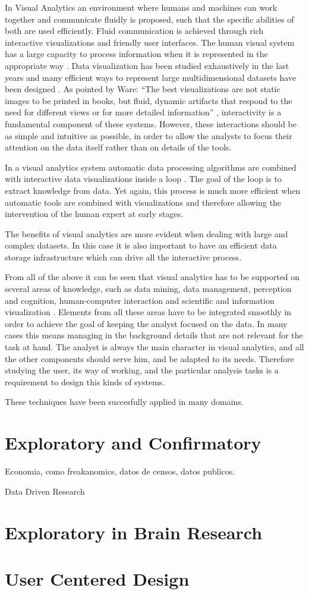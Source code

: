 In Visual Analytics an environment where humans and machines can work
together and communicate fluidly is proposed, such that the specific abilities of both are used
efficiently. Fluid communication is achieved through rich interactive
visualizations and friendly user interfaces.
The human visual system has a large capacity to process information when it is
represented in the appropriate way \autocite{ware_information_2004}. Data visualization has been studied
exhaustively in the last years and many efficient ways to represent large multidimensional
datasets have been designed \autocite{heer_tour_2010}. As
pointed by Ware: "`The best visualizations are not static images to be printed in books, but fluid,
dynamic artifacts that respond to the need for different views or for more detailed
information"' \autocite{ware_information_2004}, interactivity is a fundamental component of these systems. 
However,  these interactions should be
as simple and intuitive as possible, in order to allow the analysts to focus their attention on the
data itself \autocite{spence_information_2007} rather than on details of the tools. 

In a visual analytics system automatic data processing algorithms are combined with interactive data visualizations
inside a loop \autocite{keim_mastering_2010}. The goal of the loop is to extract knowledge from data. Yet again, this process
is much more efficient when automatic tools are combined with visualizations and therefore allowing the intervention of the
human expert at early stages. 

The benefits of visual analytics are more evident when dealing with large and complex datasets. In this case it is also important
to have an efficient data storage infrastructure which can drive all the interactive process. 

From all of the above it can be seen that visual analytics
has to be supported on several areas of knowledge, such as data mining, data management, perception and cognition, human-computer interaction and scientific and information visualization \autocite{keim_visual_2008}. Elements from all these areas have to be integrated smoothly in order to achieve the goal of keeping the analyst focused on the data. In many cases this means managing in the background details that are not relevant for the task at hand. The analyst is always the main character in visual analytics, and all the other components should serve him, and be adapted to its needs. Therefore studying the user, its way of working, and the particular analysis tasks is a requirement to design this kinds of systems. 

These techniques have been succesfully applied in many domains. 


\section{Exploratory and Confirmatory}

Economia, como freakanomics, datos de censos, datos publicos.

Data Driven Research

\section{Exploratory in Brain Research}

\section{User Centered Design}
